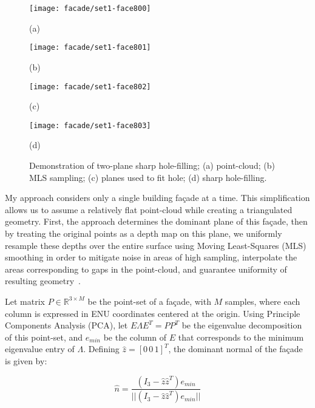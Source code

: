 \documentclass[journal]{IEEEtran}
\begin{document}
\begin{figure}[t]

\begin{minipage}[b]{.48\linewidth}
  \centering
  \centerline{\texttt{[image: facade/set1-face800]}}
  \centerline{(a)}\medskip
\end{minipage}
\hfill
\begin{minipage}[b]{.48\linewidth}
  \centering
  \centerline{\texttt{[image: facade/set1-face801]}}
  \centerline{(b)}\medskip
\end{minipage}
\begin{minipage}[b]{.48\linewidth}
  \centering
  \centerline{\texttt{[image: facade/set1-face802]}}
  \centerline{(c)}\medskip
\end{minipage}
\hfill
\begin{minipage}[b]{.48\linewidth}
  \centering
  \centerline{\texttt{[image: facade/set1-face803]}}
  \centerline{(d)}\medskip
\end{minipage}
%
\caption{Demonstration of two-plane sharp hole-filling; (a) point-cloud; (b) MLS sampling; (c) planes used to fit hole; (d) sharp hole-filling.}
\label{fig:face8-sharp}
%
\end{figure}

My approach considers only a single building fa\c{c}ade at a time.  This simplification allows us to assume a relatively flat point-cloud while creating a triangulated geometry.  First, the approach determines the dominant plane of this fa\c{c}ade, then by treating the original points as a depth map on this plane, we uniformly resample these depths over the entire surface using Moving Least-Squares (MLS) smoothing in order to mitigate noise in areas of high sampling, interpolate the areas corresponding to gaps in the point-cloud, and guarantee uniformity of resulting geometry~\cite{Nealen04}.

Let matrix $P \in \mathbb{R} ^{3 \times M}$ be the point-set of a fa\c{c}ade, with $M$ samples, where each column is expressed in ENU coordinates centered at the origin.  Using Principle Components Analysis (PCA), let $ E \Lambda E^T = PP^T $ be the eigenvalue decomposition of this point-set, and $e_{min}$ be the column of $E$ that corresponds to the minimum eigenvalue entry of $\Lambda$.  Defining $\hat{z} = [0\,0\,1]^T$, the dominant normal of the fa\c{c}ade is given by:

\begin{equation}
\hat{n} = \dfrac{( I_3 - \hat{z} \hat{z}^T ) e_{min} } {|| (I_3 - \hat{z} \hat{z}^T) e_{min} ||}
\end{equation}
\end{document}
